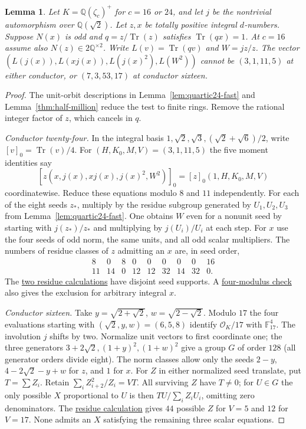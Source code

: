 \documentclass[11pt,reqno]{amsart}
\newcommand{\codecheck}[2]{\href{https://github.com/sebastienpalcoux/grothendieck-ring-classification/blob/d5750105bb5758f3ad38d2e5464dfcc12c019816/supplements/rank6/sphericality/#1}{#2}}
\newtheorem{lemma}[theorem]{Lemma}
\theoremstyle{remark}\newtheorem{remark}[theorem]{Remark}
\numberwithin{equation}{section}
\begin{document}
\begin{lemma}\label{lem:quartic-local-moments}
Let $K=\mathbb Q(\zeta_c)^+$ for $c=16$ or $24$, and let $j$ be the
nontrivial automorphism over $\mathbb Q(\sqrt2)$. Let $z,x$ be totally
positive integral $d$-numbers.
Suppose $N(x)$ is odd and $q=z/\operatorname{Tr}(z)$ satisfies
$\operatorname{Tr}(qx)=1$. At $c=16$ assume also $N(z)\in2\mathbb Q^{\times2}$.
Write $L(v)=\operatorname{Tr}(qv)$ and $W=jz/z$.
The vector $(L(j(x)),L(xj(x)),L(j(x)^2),L(W^2))$ cannot be
$(3,1,11,5)$ at either conductor, or $(7,3,53,17)$ at conductor sixteen.
\end{lemma}
\begin{proof}
The unit-orbit descriptions in Lemma~\ref{lem:quartic24-fast} and
Lemma~\ref{thm:half-million} reduce the test to finite rings.
Remove the rational integer factor of $z$, which cancels in $q$.

\emph{Conductor twenty-four.}
In the integral basis $1,\sqrt2,\sqrt3,(\sqrt2+\sqrt6)/2$, write
$[v]_0=\operatorname{Tr}(v)/4$. For $(H,K_0,M,V)=(3,1,11,5)$
the five moment identities say
\[
 [z(x,j(x),xj(x),j(x)^2,W^2)]_0=[z]_0(1,H,K_0,M,V)
\]
coordinatewise. Reduce these equations modulo $8$ and $11$ independently.
For each of the eight seeds $z_*$, multiply by the residue subgroup
generated by $U_1,U_2,U_3$ from Lemma~\ref{lem:quartic24-fast}.
One obtains $W$ even for a nonunit seed by starting with
$j(z_*)/z_*$ and multiplying by $j(U_i)/U_i$ at each step.
For $x$ use the four seeds of odd norm, the same units, and all odd
scalar multipliers. The numbers of residue classes of $z$ admitting
an $x$ are, in seed order,
\[
\begin{array}{c|rrrrrrrr}
8 &0&8&0&0&0&0&0&16\\
11&14&0&12&12&32&14&32&0 .
\end{array}
\]
The \codecheck{field_checks/moments/quartic24_two_primes.py}{two residue calculations}
have disjoint seed supports. A
\codecheck{field_checks/moments/quartic24.py}{four-modulus check}
also gives the exclusion for arbitrary integral $x$.

\emph{Conductor sixteen.}
Take $y=\sqrt{2+\sqrt2}$, $w=\sqrt{2-\sqrt2}$. Modulo $17$ the
four evaluations starting with $(\sqrt2,y,w)=(6,5,8)$ identify
$\mathcal O_K/17$ with $\mathbb F_{17}^4$. The involution $j$ shifts
by two. Normalize unit vectors to first coordinate one; the three
generators $3+2\sqrt2,(1+y)^2,(1+w)^2$ give a group $G$ of order
$128$ (all generator orders divide eight). The norm classes allow
only the seeds $2-y$, $4-2\sqrt2-y+w$ for $z$, and $1$ for $x$.
For $Z$ in either normalized seed translate, put $T=\sum Z_i$.
Retain $\sum_i Z_{i+2}^2/Z_i=VT$. All surviving $Z$ have $T\ne0$;
for $U\in G$ the only possible $X$ proportional to $U$ is then
$TU/\sum_iZ_iU_i$, omitting zero denominators.
The \codecheck{field_checks/moments/quartic16.py}{residue calculation}
gives $44$ possible $Z$ for $V=5$ and $12$ for $V=17$.
None admits an $X$ satisfying the remaining three scalar equations.
\end{proof}
\end{document}
